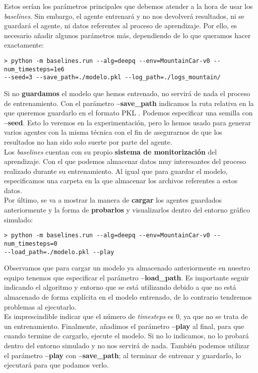 \documentclass[11pt,fleqn]{book} %
\begin{document}
Estos serían los parámetros principales que debemos atender a la hora de usar los \textit{baselines}. Sin embargo, el agente entrenará y no nos devolverá resultados, ni se guardará el agente, ni datos referentes al proceso de aprendizaje. Por ello, es necesario añadir algunos parámetros más, dependiendo de lo que queramos hacer exactamente:

\begin{verbatim}
> python -m baselines.run --alg=deepq --env=MountainCar-v0 --num_timesteps=1e6
--seed=3 --save_path=./modelo.pkl --log_path=./logs_mountain/
\end{verbatim}

Si no \textbf{guardamos} el modelo que hemos entrenado, no servirá de nada el proceso de entrenamiento. Con el parámetro \textbf{--save\_path} indicamos la ruta relativa en la que queremos guardarlo en el formato PKL \cite{article:pkl}. Podemos especificar una semilla con \textbf{--seed}. Esto lo veremos en la experimentación, pero lo hemos usado para generar varios agentes con la misma técnica con el fin de asegurarnos de que los resultados no han sido solo suerte por parte del agente. \\

Los \textit{baselines} cuentan con su propio \textbf{sistema de monitorización} del aprendizaje. Con el que podemos almacenar datos muy interesantes del proceso realizado durante su entrenamiento. Al igual que para guardar el modelo, especificamos una carpeta en la que almacenar los archivos referentes a estos datos. \\

Por último, se va a mostrar la manera de \textbf{cargar} los agentes guardados anteriormente y la forma de \textbf{probarlos} y visualizarlos dentro del entorno gráfico simulado:

\begin{verbatim}
> python -m baselines.run --alg=deepq --env=MountainCar-v0 --num_timesteps=0
--load_path=./modelo.pkl --play
\end{verbatim}

Observamos que para cargar un modelo ya almacenado anteriormente en nuestro equipo tenemos que especificar el parámetro \textbf{--load\_path}. Es importante seguir indicando el algoritmo y entorno que se está utilizando debido a que no está almacenado de forma explícita en el modelo entrenado, de lo contrario tendremos problemas al ejecutarlo. \\

Es imprescindible indicar que el número de \textit{timesteps} es 0, ya que no se trata de un entrenamiento. Finalmente, añadimos el parámetro \textbf{--play} al final, para que cuando termine de cargarlo, ejecute el modelo. Si no lo indicamos, no lo probará dentro del entorno simulado y no nos servirá de nada. También podemos utilizar el parámetro \textbf{--play} con \textbf{--save\_path}; al terminar de entrenar y guardarlo, lo ejecutará para que podamos verlo.
\end{document}
